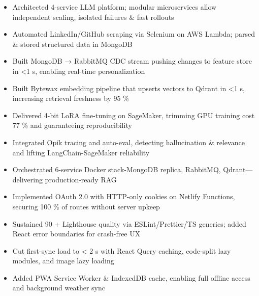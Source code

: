 \documentclass{resume}
\begin{document}
 {}


\begin{itemize}
  \item Architected 4-service LLM platform; modular microservices allow independent scaling, isolated failures \& fast rollouts
  \item Automated LinkedIn/GitHub scraping via Selenium on AWS Lambda; parsed \& stored structured data in MongoDB
  \item Built MongoDB → RabbitMQ CDC stream pushing changes to feature store in <1 s, enabling real-time personalization

  \item Built Bytewax embedding pipeline that upserts vectors to Qdrant in <1 s, increasing retrieval freshness by 95 \%

  \item Delivered 4-bit LoRA fine-tuning on SageMaker, trimming GPU training cost 77 \% and guaranteeing reproducibility


  \item Integrated Opik tracing and auto-eval, detecting hallucination \& relevance and lifting LangChain-SageMaker reliability
  \item Orchestrated 6-service Docker stack-MongoDB replica, RabbitMQ, Qdrant—delivering production-ready RAG
 

\end{itemize}


 {}

\begin{itemize}
  \item Implemented OAuth 2.0 with HTTP-only cookies on Netlify Functions, securing 100 \% of routes without server upkeep

  \item Sustained 90 + Lighthouse quality via ESLint/Prettier/TS generics; added React error boundaries for crash-free UX

  \item Cut first-sync load to < 2 s with React Query caching, code-split lazy modules, and image lazy loading
  \item Added PWA Service Worker \& IndexedDB cache, enabling full offline access and background weather sync


\end{itemize}


\end{document}
